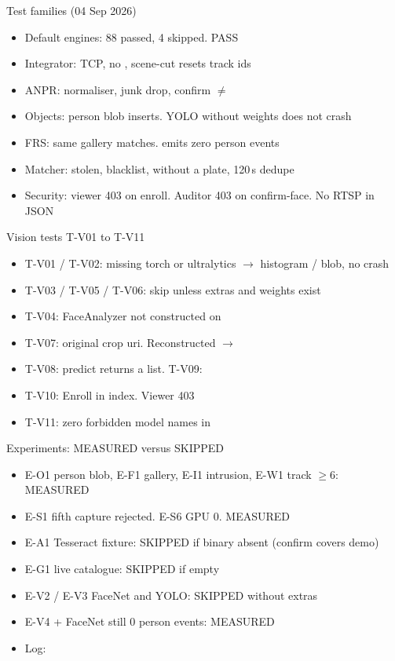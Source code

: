 \documentclass[aspectratio=169,11pt]{beamer}
\begin{document}
\begin{frame}{Test families (04 Sep 2026)}
\begin{itemize}\itemsep0.45em
\item Default engines: 88 passed, 4 skipped.  PASS
\item Integrator: TCP, no , scene-cut resets track ids
\item ANPR: normaliser, junk drop, confirm $\neq$ 
\item Objects: person blob inserts. YOLO without weights does not crash
\item FRS: same gallery matches.  emits zero person events
\item Matcher: stolen, blacklist,  without a plate, 120\,s dedupe
\item Security: viewer 403 on enroll. Auditor 403 on confirm-face. No RTSP in JSON
\end{itemize}
\end{frame}

\begin{frame}{Vision tests T-V01 to T-V11}
\begin{itemize}\itemsep0.4em
\item T-V01 / T-V02: missing torch or ultralytics $\to$ histogram / blob, no crash
\item T-V03 / T-V05 / T-V06: skip unless extras and weights exist
\item T-V04: FaceAnalyzer not constructed on 
\item T-V07: original crop uri. Reconstructed $\to$ 
\item T-V08: predict returns a list. T-V09: 
\item T-V10: Enroll in index. Viewer 403
\item T-V11: zero forbidden model names in 
\end{itemize}
\end{frame}

\begin{frame}{Experiments: MEASURED versus SKIPPED}
\begin{itemize}\itemsep0.45em
\item E-O1 person blob, E-F1 gallery, E-I1 intrusion, E-W1 track $\ge 6$: MEASURED
\item E-S1 fifth capture rejected. E-S6 GPU 0. MEASURED
\item E-A1 Tesseract fixture: SKIPPED if binary absent (confirm covers demo)
\item E-G1 live catalogue: SKIPPED if  empty
\item E-V2 / E-V3 FaceNet and YOLO: SKIPPED without extras
\item E-V4  + FaceNet still 0 person events: MEASURED
\item Log: 
\end{itemize}
\end{frame}
\end{document}
